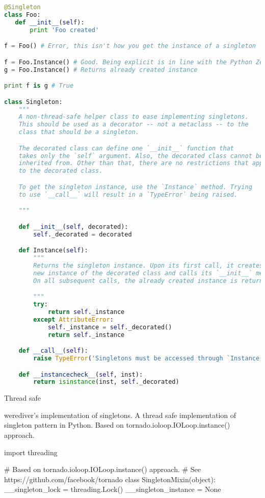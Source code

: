 \begin{lstlisting}[language=Python]
@Singleton
class Foo:
   def __init__(self):
       print 'Foo created'

f = Foo() # Error, this isn't how you get the instance of a singleton

f = Foo.Instance() # Good. Being explicit is in line with the Python Zen
g = Foo.Instance() # Returns already created instance

print f is g # True

class Singleton:
    """
    A non-thread-safe helper class to ease implementing singletons.
    This should be used as a decorator -- not a metaclass -- to the
    class that should be a singleton.

    The decorated class can define one `__init__` function that
    takes only the `self` argument. Also, the decorated class cannot be
    inherited from. Other than that, there are no restrictions that apply
    to the decorated class.

    To get the singleton instance, use the `Instance` method. Trying
    to use `__call__` will result in a `TypeError` being raised.

    """

    def __init__(self, decorated):
        self._decorated = decorated

    def Instance(self):
        """
        Returns the singleton instance. Upon its first call, it creates a
        new instance of the decorated class and calls its `__init__` method.
        On all subsequent calls, the already created instance is returned.

        """
        try:
            return self._instance
        except AttributeError:
            self._instance = self._decorated()
            return self._instance

    def __call__(self):
        raise TypeError('Singletons must be accessed through `Instance()`.')

    def __instancecheck__(self, inst):
        return isinstance(inst, self._decorated)
\end{lstlisting}

Thread safe

werediver's implementation of singletons. A thread safe implementation of singleton pattern in Python. Based on tornado.ioloop.IOLoop.instance() approach.

import threading

# Based on tornado.ioloop.IOLoop.instance() approach.
# See https://github.com/facebook/tornado
class SingletonMixin(object):
    __singleton_lock = threading.Lock()
    __singleton_instance = None

